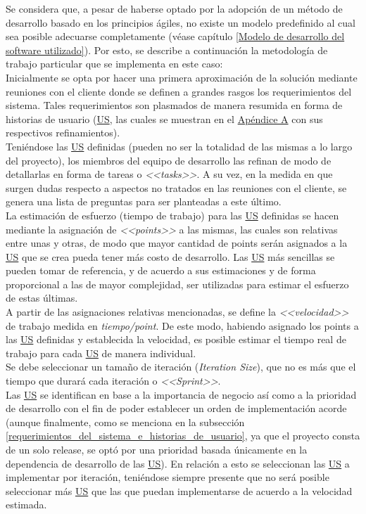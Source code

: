 \documentclass[a4paper, 12pt,twoside]{report}  %
\numberwithin{equation}{subsection} %
\begin{document}
Se considera que, a pesar de haberse optado por la adopción de un método de desarrollo basado en los principios ágiles, no existe un modelo predefinido al cual sea posible adecuarse completamente  (véase capítulo \ref{Modelo de desarrollo del software utilizado}). Por esto, se describe a continuación la metodología de trabajo particular que se implementa en este caso:\\
\indent Inicialmente se opta por hacer una primera aproximación de la solución mediante reuniones con el cliente donde se definen a grandes rasgos los requerimientos del sistema. Tales requerimientos son plasmados de manera resumida en forma de historias de usuario (\hyperlink{US}{US}, las cuales se muestran en el \hyperlink{apendice_a}{Apéndice A} con sus respectivos refinamientos).\\
\indent Teniéndose las \hyperlink{US}{US} definidas (pueden no ser la totalidad de las mismas a lo largo del proyecto), los miembros del equipo de desarrollo las refinan de modo de detallarlas en forma de tareas o \textit{<<tasks>>}. A su vez, en la medida en que surgen dudas respecto a aspectos no tratados en las reuniones con el cliente, se genera una lista de preguntas para ser planteadas a este último.\\
\indent La estimación de esfuerzo (tiempo de trabajo) para las \hyperlink{US}{US} definidas se hacen mediante la asignación de \textit{<<points>>} a las mismas, las cuales son relativas entre unas y otras, de modo que mayor cantidad de points serán asignados a la \hyperlink{US}{US} que se crea pueda tener más costo de desarrollo. Las \hyperlink{US}{US} más sencillas se pueden tomar de referencia, y de acuerdo a sus estimaciones y de forma proporcional a las de mayor complejidad, ser utilizadas para estimar el esfuerzo de estas últimas.\\
\indent A partir de las asignaciones relativas mencionadas, se define la \textit{<<velocidad>>} de trabajo medida en \textit{tiempo/point}. De este modo, habiendo asignado los points a las \hyperlink{US}{US} definidas y establecida la velocidad, es posible estimar el tiempo real de trabajo para cada \hyperlink{US}{US} de manera individual.\\
\indent Se debe seleccionar un tamaño de iteración (\textit{Iteration Size}), que no es más que el tiempo que durará cada iteración o \textit{<<Sprint>>}.\\
\indent Las \hyperlink{US}{US} se identifican en base a la importancia de negocio así como a la prioridad de desarrollo con el fin de poder establecer un orden de implementación acorde (aunque finalmente, como se menciona en la subsección \ref{requerimientos_del_sistema_e_historias_de_usuario}, ya que el proyecto consta de un solo release, se optó por una prioridad basada únicamente en la dependencia de desarrollo de las \hyperlink{US}{US}). En relación a esto se seleccionan las \hyperlink{US}{US} a implementar por iteración, teniéndose siempre presente que no será posible seleccionar más \hyperlink{US}{US} que las que puedan implementarse de acuerdo a la velocidad estimada.\\
\end{document}
